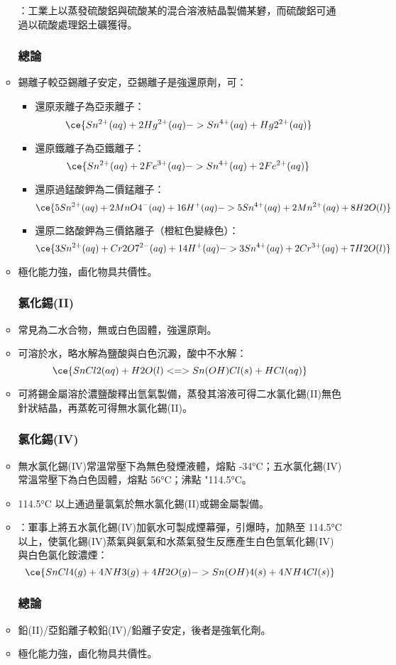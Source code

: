 \documentclass[a4paper,12pt]{report}
\begin{document}
\begin{itemize}
\begin{itemize}
：工業上以蒸發硫酸鋁與硫酸某的混合溶液結晶製備某礬，而硫酸鋁可通過以硫酸處理鋁土礦獲得。
\subsubsection{總論}
\bit
\item 錫離子較亞錫離子安定，亞錫離子是強還原劑，可：
\begin{itemize}
\item 還原汞離子為亞汞離子：
\[\ce{Sn^{2+}(aq) + 2Hg^{2+}(aq) -> Sn^{4+}(aq) + Hg2^{2+}(aq)}\]
\item 還原鐵離子為亞鐵離子：
\[\ce{Sn^{2+}(aq) + 2Fe^{3+}(aq) -> Sn^{4+}(aq) + 2Fe^{2+}(aq)}\]
\item 還原過錳酸鉀為二價錳離子：
\[\ce{5Sn^{2+}(aq) + 2MnO4^-(aq) + 16H^+(aq) -> 5Sn^{4+}(aq) + 2Mn^{2+}(aq) + 8H2O(l)}\]
\item 還原二鉻酸鉀為三價鉻離子（橙紅色變綠色）：
\[\ce{3Sn^{2+}(aq) + Cr2O7^{2-}(aq) + 14H^+(aq) -> 3Sn^{4+}(aq) + 2Cr^{3+}(aq) + 7H2O(l)}\]
\end{itemize}
\item {}極化能力強，鹵化物具共價性。
\eit
\subsubsection{氯化錫(II)}
\bit
\item 常見為二水合物，無或白色固體，強還原劑。
\item 可溶於水，略水解為鹽酸與白色沉澱，酸中不水解：
\[\ce{SnCl2(aq) + H2O(l) <=> Sn(OH)Cl(s) + HCl(aq)}\]
\item 可將錫金屬溶於濃鹽酸釋出氫氣製備，蒸發其溶液可得二水氯化錫(II)無色針狀結晶，再蒸乾可得無水氯化錫(II)。
\eit
\subsubsection{氯化錫(IV)}
\bit
\item 無水氯化錫(IV)常溫常壓下為無色發煙液體，熔點 -34°C；五水氯化錫(IV)常溫常壓下為白色固體，熔點 56°C；沸點 "114.5°C。
\item 114.5°C 以上通過量氯氣於無水氯化錫(II)或錫金屬製備。
\item {}：軍事上將五水氯化錫(IV)加氨水可製成煙幕彈，引爆時，加熱至 114.5°C 以上，使氯化錫(IV)蒸氣與氨氣和水蒸氣發生反應產生白色氫氧化錫(IV)與白色氯化銨濃煙：
\[\ce{SnCl4(g) + 4NH3(g) + 4H2O(g) -> Sn(OH)4(s) + 4NH4Cl(s)}\]
\eit
{}
\subsubsection{總論}
\bit
\item 鉛(II)/亞鉛離子較鉛(IV)/鉛離子安定，後者是強氧化劑。
\item {}極化能力強，鹵化物具共價性。
\eit

\end{itemize}
\end{itemize}
\end{document}
